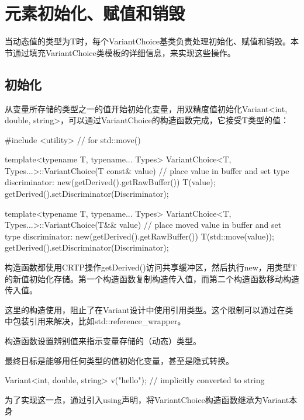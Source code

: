 \section{元素初始化、赋值和销毁}


当动态值的类型为T时，每个VariantChoice基类负责处理初始化、赋值和销毁。本节通过填充VariantChoice类模板的详细信息，来实现这些操作。


\subsection{初始化}

从变量所存储的类型之一的值开始初始化变量，用双精度值初始化Variant<int, double, string>，可以通过VariantChoice的构造函数完成，它接受T类型的值：

\begin{cpp}
#include <utility> // for std::move()

template<typename T, typename... Types>
VariantChoice<T, Types...>::VariantChoice(T const& value) {
	// place value in buffer and set type discriminator:
	new(getDerived().getRawBuffer()) T(value);
	getDerived().setDiscriminator(Discriminator);
}

template<typename T, typename... Types>
VariantChoice<T, Types...>::VariantChoice(T&& value) {
	// place moved value in buffer and set type discriminator:
	new(getDerived().getRawBuffer()) T(std::move(value));
	getDerived().setDiscriminator(Discriminator);
}
\end{cpp}

构造函数都使用CRTP操作getDerived()访问共享缓冲区，然后执行new，用类型T的新值初始化存储。第一个构造函数复制构造传入值，而第二个构造函数移动构造传入值。

\begin{notice}
这里的构造使用，阻止了在Variant设计中使用引用类型。这个限制可以通过在类中包装引用来解决，比如std::reference\_wrapper。
\end{notice}

构造函数设置辨别值来指示变量存储的（动态）类型。

最终目标是能够用任何类型的值初始化变量，甚至是隐式转换。

\begin{cpp}
Variant<int, double, string> v("hello"); // implicitly converted to string
\end{cpp}

为了实现这一点，通过引入using声明，将VariantChoice构造函数继承为Variant本身

